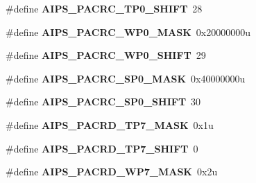 \begin{DoxyCompactItemize}
\item 
\#define {\bfseries A\+I\+P\+S\+\_\+\+P\+A\+C\+R\+C\+\_\+\+T\+P0\+\_\+\+S\+H\+I\+FT}~28\hypertarget{group__AIPS__Register__Masks_gac6a87baabf4dccff778f7784d9c723d9}{}\label{group__AIPS__Register__Masks_gac6a87baabf4dccff778f7784d9c723d9}

\item 
\#define {\bfseries A\+I\+P\+S\+\_\+\+P\+A\+C\+R\+C\+\_\+\+W\+P0\+\_\+\+M\+A\+SK}~0x20000000u\hypertarget{group__AIPS__Register__Masks_ga88f5917b508d706482e80a4a0b2a35e5}{}\label{group__AIPS__Register__Masks_ga88f5917b508d706482e80a4a0b2a35e5}

\item 
\#define {\bfseries A\+I\+P\+S\+\_\+\+P\+A\+C\+R\+C\+\_\+\+W\+P0\+\_\+\+S\+H\+I\+FT}~29\hypertarget{group__AIPS__Register__Masks_ga29bde3efaa241ca6bf204175cd39fc1e}{}\label{group__AIPS__Register__Masks_ga29bde3efaa241ca6bf204175cd39fc1e}

\item 
\#define {\bfseries A\+I\+P\+S\+\_\+\+P\+A\+C\+R\+C\+\_\+\+S\+P0\+\_\+\+M\+A\+SK}~0x40000000u\hypertarget{group__AIPS__Register__Masks_ga7d1ea8b3754b6cc0e640b1f0d20790a4}{}\label{group__AIPS__Register__Masks_ga7d1ea8b3754b6cc0e640b1f0d20790a4}

\item 
\#define {\bfseries A\+I\+P\+S\+\_\+\+P\+A\+C\+R\+C\+\_\+\+S\+P0\+\_\+\+S\+H\+I\+FT}~30\hypertarget{group__AIPS__Register__Masks_ga1dbf263f8190817a502edfdfa205a582}{}\label{group__AIPS__Register__Masks_ga1dbf263f8190817a502edfdfa205a582}

\item 
\#define {\bfseries A\+I\+P\+S\+\_\+\+P\+A\+C\+R\+D\+\_\+\+T\+P7\+\_\+\+M\+A\+SK}~0x1u\hypertarget{group__AIPS__Register__Masks_gafb73ac29a92021949417b7bd6bbe5672}{}\label{group__AIPS__Register__Masks_gafb73ac29a92021949417b7bd6bbe5672}

\item 
\#define {\bfseries A\+I\+P\+S\+\_\+\+P\+A\+C\+R\+D\+\_\+\+T\+P7\+\_\+\+S\+H\+I\+FT}~0\hypertarget{group__AIPS__Register__Masks_ga3a769fd24072d69dda49281bde8aa20f}{}\label{group__AIPS__Register__Masks_ga3a769fd24072d69dda49281bde8aa20f}

\item 
\#define {\bfseries A\+I\+P\+S\+\_\+\+P\+A\+C\+R\+D\+\_\+\+W\+P7\+\_\+\+M\+A\+SK}~0x2u\hypertarget{group__AIPS__Register__Masks_ga38af2fc3252222dc67267a0a2d675060}{}\label{group__AIPS__Register__Masks_ga38af2fc3252222dc67267a0a2d675060}


\end{DoxyCompactItemize}
